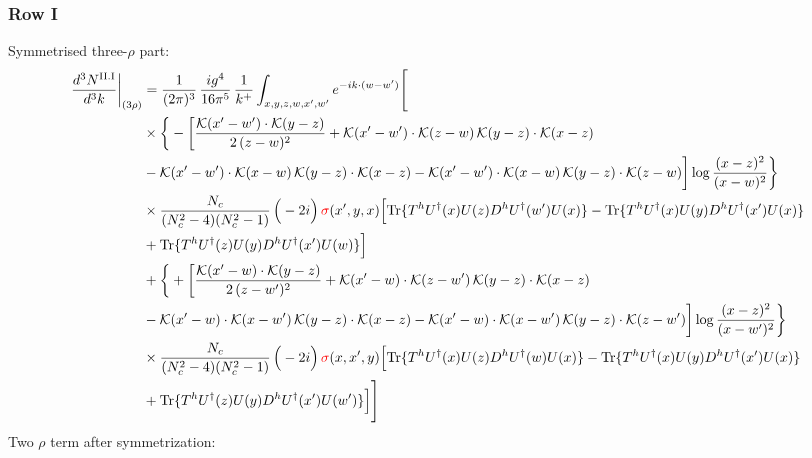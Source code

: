 \documentclass[9pt]{article}
\numberwithin{equation}{section}
\begin{document}
\subsubsection*{Row I}
Symmetrised three-$\rho$ part:
\begin{align}
\frac{d^{3}N^{\rm II.I}}{d^{3}k}\bigg|_{(3\rho)}&=\frac{1}{(2\pi)^{3}}\,\frac{ig^{4}}{16\pi^{5}}\,\frac{1}{k^{+}}\int_{x,y,z,w,x',w'}e^{-ik\cdot(w-w')}\Bigg[\notag\\
&\times\bigg\{-\bigg[\frac{\mathcal{K}(x'-w')\cdot\mathcal{K}(y-z)}{2\,(z-w)^{2}}+\mathcal{K}(x'-w')\cdot\mathcal{K}(z-w)\,\mathcal{K}(y-z)\cdot\mathcal{K}(x-z)\notag\\
&-\mathcal{K}(x'-w')\cdot\mathcal{K}(x-w)\,\mathcal{K}(y-z)\cdot\mathcal{K}(x-z)-\mathcal{K}(x'-w')\cdot\mathcal{K}(x-w)\,\mathcal{K}(y-z)\cdot\mathcal{K}(z-w)\bigg]\log\frac{(x-z)^{2}}{(x-w)^{2}}\bigg\}\notag\\
&\times \frac{N_{c}}{(N_{c}^{2}-4)(N_{c}^{2}-1)}\,\Big(-2i\Big)\,{\color{red}\sigma}(x',y,x)\Big[{\rm Tr}\{T^{h}U^{\dagger}(x)U(z)D^{h}U^{\dagger}(w')U(x)\}-{\rm Tr}\{T^{h}U^{\dagger}(x)U(y)D^{h}U^{\dagger}(x')U(x)\}\notag\\
& +{\rm Tr}\{T^{h}U^{\dagger}(z)U(y)D^{h}U^{\dagger}(x')U(w)\}\Big]\notag\\
&+\bigg\{+\bigg[\frac{\mathcal{K}(x'-w)\cdot\mathcal{K}(y-z)}{2\,(z-w')^{2}}+\mathcal{K}(x'-w)\cdot\mathcal{K}(z-w')\,\mathcal{K}(y-z)\cdot\mathcal{K}(x-z)\notag\\
&-\mathcal{K}(x'-w)\cdot\mathcal{K}(x-w')\,\mathcal{K}(y-z)\cdot\mathcal{K}(x-z)-\mathcal{K}(x'-w)\cdot\mathcal{K}(x-w')\,\mathcal{K}(y-z)\cdot\mathcal{K}(z-w')\bigg]\log\frac{(x-z)^{2}}{(x-w')^{2}}\bigg\}\notag\\
&\times \frac{N_{c}}{(N_{c}^{2}-4)(N_{c}^{2}-1)}\,\Big(-2i\Big)\,{\color{red}\sigma}(x,x',y)\Big[{\rm Tr}\{T^{h}U^{\dagger}(x)U(z)D^{h}U^{\dagger}(w)U(x)\}-{\rm Tr}\{T^{h}U^{\dagger}(x)U(y)D^{h}U^{\dagger}(x')U(x)\}\notag\\
& +{\rm Tr}\{T^{h}U^{\dagger}(z)U(y)D^{h}U^{\dagger}(x')U(w')\}\Big]\Bigg]\label{eq:E-II.I-3}
\end{align}
Two $\rho$ term after symmetrization:
\end{document}
